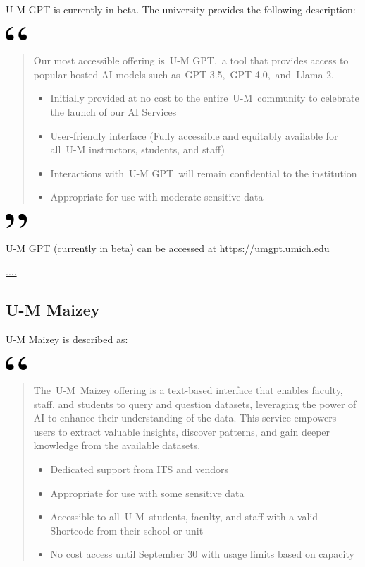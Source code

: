 \documentclass[
]{book}
\begin{document}
U-M GPT is currently in beta. The university provides the following description:

\includegraphics[width=0.3125in,height=0.20833in]{open.png}

\begin{quote}
Our most accessible offering is~U-M GPT,~a tool that provides access to popular hosted AI models such as~GPT 3.5,~GPT 4.0,~and~Llama 2.

\begin{itemize}
\item
  Initially provided at no cost to the entire~U-M~community to celebrate the launch of our AI Services
\item
  User-friendly interface (Fully accessible and equitably available for all~U-M instructors, students, and staff)
\item
  Interactions with~U-M GPT~will remain confidential to the institution
\item
  Appropriate for use with moderate sensitive data
\end{itemize}
\end{quote}

\includegraphics[width=0.3125in,height=0.20833in]{close.png}

U-M GPT (currently in beta) can be accessed at \url{https://umgpt.umich.edu}

\url{....}

\hypertarget{u-m-maizey}{%
\subsection{U-M Maizey}\label{u-m-maizey}}

U-M Maizey is described as:

\includegraphics[width=0.3125in,height=0.20833in]{open.png}

\begin{quote}
The~U-M~Maizey offering is a text-based interface that enables faculty, staff, and students to query and question datasets, leveraging the power of AI to enhance their understanding of the data. This service empowers users to extract valuable insights, discover patterns, and gain deeper knowledge from the available datasets.

\begin{itemize}
\item
  Dedicated support from ITS and vendors
\item
  Appropriate for use with some sensitive data
\item
  Accessible to all~U-M~students, faculty, and staff with a valid Shortcode from their school or unit
\item
  No cost access until September 30 with usage limits based on capacity
\end{itemize}
\end{quote}
\end{document}
